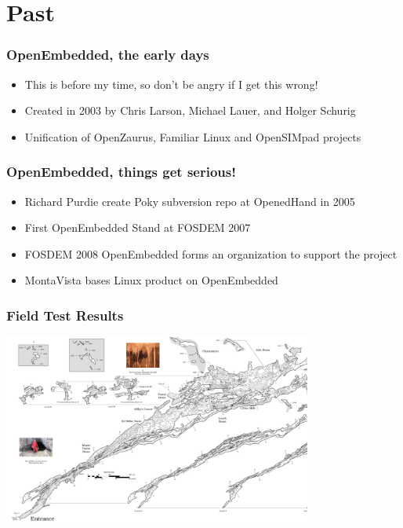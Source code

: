 \documentclass{beamer}
\begin{document}
\section{Past}

\begin{frame}
\frametitle{OpenEmbedded, the early days}


	\begin{itemize}
		\item This is before my time, so don't be angry if I get this wrong!
		\item Created in 2003 by Chris Larson, Michael Lauer, and Holger Schurig
		\item Unification of OpenZaurus, Familiar Linux and OpenSIMpad projects
	\end{itemize}

\end{frame}

\begin{frame}
\frametitle{OpenEmbedded, things get serious! }

\begin{itemize}
	\item Richard Purdie create Poky subversion repo at OpenedHand in 2005
	\item First OpenEmbedded Stand at FOSDEM 2007
	\item FOSDEM 2008 OpenEmbedded forms an organization to support the project
	\item MontaVista bases Linux product on OpenEmbedded
\end{itemize}

\end{frame}

\begin{frame}
	\frametitle{Field Test Results}

\begin{center}
\includegraphics[width=4.0in]{../images/New-River-June-4-2024.png}
\end{center}

\end{frame}
\end{document}
